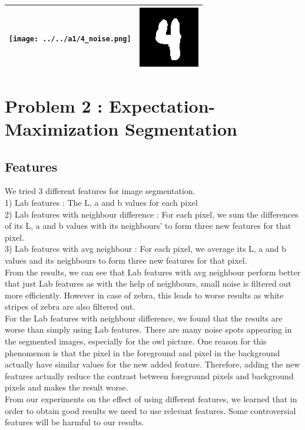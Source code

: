\documentclass{article}
\begin{document}
\begin{center}
 \begin{tabular}{||c c||}
 \hline
 \texttt{[image: ../../a1/4\_noise.png]} & \includegraphics[width=.4\linewidth]{../image-denoising/output/4_denoise.png} \\ 
 \hline

\end{tabular}
\end{center}


\section{Problem 2 : Expectation-Maximization Segmentation}
\subsection{Features}
We tried 3 different features for image segmentation.\\
1) Lab features : The L, a and b values for each pixel \\
2) Lab features with neighbour difference : For each pixel, we sum the differences of its L, a and b values with its neighbours' to form three new features for that pixel. \\
3) Lab features with avg neighbour : For each pixel, we average its L, a and b values and its neighbours to form three new features for that pixel. \\

From the results, we can see that Lab features with avg neighbour perform better that just Lab features as with the help of neighbours, small noise is filtered out more efficiently. However in case of zebra, this leads to worse results as white stripes of zebra are also filtered out. \\
For the Lab features with neighbour difference, we found that the results are worse than simply using Lab features. There are many noise spots appearing in the segmented images, especially for the owl picture. One reason for this phenomenon is that the pixel in the foreground and pixel in the background actually have similar values for the new added feature. Therefore, adding the new features actually reduce the contrast between foreground pixels and background pixels and makes the result worse. \\
From our experiments on the effect of using different features, we learned that in order to obtain good results we need to use relevant features. Some controversial features will be harmful to our results. \\
\end{document}
